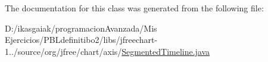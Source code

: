 The documentation for this class was generated from the following file\+:\begin{DoxyCompactItemize}
\item 
D\+:/ikasgaiak/programacion\+Avanzada/\+Mis Ejercicios/\+P\+B\+Ldefinitibo2/libs/jfreechart-\/1../source/org/jfree/chart/axis/\mbox{\hyperlink{_segmented_timeline_8java}{Segmented\+Timeline.\+java}}\end{DoxyCompactItemize}
